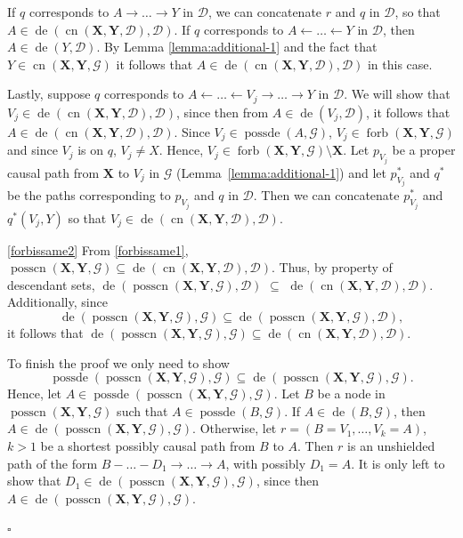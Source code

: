 \documentclass[11pt,a4paper]{article}
\theoremstyle{definition}
\theoremstyle{remark}
\newenvironment{proofof}[1][]{\begin{trivlist}
\item[\hskip \labelsep {\textit{Proof of #1.}}]}{\hfill{}$\square$\end{trivlist}}
\DeclareMathOperator{\Forbb}{forb}
\DeclareMathOperator{\de}{de}
\DeclareMathOperator{\possde}{possde}
\DeclareMathOperator{\CN}{cn}
\DeclareMathOperator{\possCN}{posscn}
\newcommand{\g}[1][G]{\mathcal{#1}}
\newcommand{\fb}[2][X,Y]{\Forbb(\mathbf{#1},#2)}
\newcommand{\cnb}[2][X,Y]{\CN(\mathbf{#1},#2)}
\newcommand{\posscnb}[2][X,Y]{\possCN(\mathbf{#1},#2)}
\begin{document}
\begin{proofof}[Lemma~\ref{lemma:forbIsSame}]
	If $q$ corresponds to  $A \rightarrow \dots \rightarrow Y$ in $\g[D]$, we can concatenate $r$ and $q$ in $\g[D]$, so that $A \in \de(\cnb{\g[D]},\g[D])$. If $q$ corresponds to $A \leftarrow \dots \leftarrow Y$ in $\g[D]$, then $A \in \de(Y, \g[D])$. By Lemma \ref{lemma:additional-1} and the fact that $Y \in \cnb{\g}$ it follows that $A \in \de(\cnb{\g[D]},\g[D])$ in this case. 
	
		Lastly, suppose $q$ corresponds to $A \leftarrow \dots \leftarrow V_j \rightarrow \dots \rightarrow Y$ in $\g[D]$.  We will show that $V_j \in \de(\cnb{\g[D]},\g[D])$, since then from $A \in \de(V_j, \g[D])$, it follows that $A \in  \de(\cnb{\g[D]},\g[D])$.  Since $V_j \in \possde(A,\g)$, $V_j \in \fb{\g}$ and since $V_j$ is on $q$, $V_j \neq X$. Hence, $V_j \in \fb{\g} \setminus \mathbf{X}$. Let $p_{V_{j}}$ be a proper causal path from $\mathbf{X}$ to $V_j$ in $\g$ (Lemma~\ref{lemma:additional-1}) and let ${p}_{V_{j}}^*$ and $q^*$ be the paths corresponding to $p_{V_{j}}$ and $q$ in $\g[D]$. Then we can concatenate ${p}_{V_{j}}^*$ and $q^{*}(V_j,Y)$ so that $V_j \in \de(\cnb{\g[D]},\g[D])$. %
		
		\ref{forbissame2} From \ref{forbissame1}, $\posscnb{\g} \subseteq \de(\cnb{\g[D]},\g[D])$. 
		Thus, by property of descendant sets, $\de(\posscnb{\g}, \g[D])$ $\subseteq$ $\de(\cnb{\g[D]},\g[D])$. Additionally, since 
		\[\de(\posscnb{\g}, \g) \subseteq \de(\posscnb{\g},\g[D]),\]
		 it follows that $\de(\posscnb{\g}, \g) \subseteq \de(\cnb{\g[D]},\g[D])$. 
		
		To finish the proof we only need to show 
		\[\possde(\posscnb{\g},\g) \subseteq \de(\posscnb{\g}, \g). \]
		 Hence, let $A \in \possde(\posscnb{\g},\g)$.
		Let $B$ be a node in $\posscnb{\g}$ such that $A \in \possde(B,\g)$. If $A \in \de(B,\g)$, then $A \in \de(\posscnb{\g}, \g)$. 
		Otherwise, let $r = ( B=V_1,\dots, V_k=A)$, $k >1$ be a shortest possibly causal path from $B$ to $A$. 
		Then $r$ is an unshielded path of the form $B - \dots -D_1 \rightarrow \dots \rightarrow A$, with possibly $D_1 = A$.
		It is only left to show that $D_1 \in \de(\posscnb{\g},\g)$, since then $A \in \de(\posscnb{\g},\g)$.
		

\end{proofof}
\end{document}
